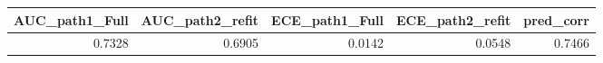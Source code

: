 \begin{tabular}{rrrrr}
\toprule
AUC_path1_Full & AUC_path2_refit & ECE_path1_Full & ECE_path2_refit & pred_corr \\
\midrule
0.7328 & 0.6905 & 0.0142 & 0.0548 & 0.7466 \\
\bottomrule
\end{tabular}
